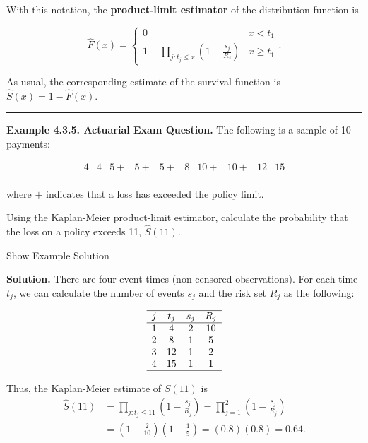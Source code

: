 \documentclass[]{book}
\theoremstyle{definition}
\theoremstyle{definition}
\theoremstyle{definition}
\theoremstyle{remark}
\begin{document}
With this notation, the \textbf{product-limit estimator} of the
distribution function is

\begin{equation}
\hat{F}(x) =
\left\{
\begin{array}{ll}
0 & x<t_{1} \\
1-\prod_{j:t_{j} \leq x}\left( 1-\frac{s_j}{R_{j}}\right) & x \geq t_{1} 
\end{array}
\right. .\label{eq:KaplanMeier}
\end{equation}

As usual, the corresponding estimate of the survival function is
\(\hat{S}(x) = 1 - \hat{F}(x)\).

\begin{center}\rule{0.5\linewidth}{\linethickness}\end{center}

\textbf{Example 4.3.5. Actuarial Exam Question.} The following is a
sample of 10 payments:

\[\begin{array}{cccccccccc}
4 &4 &5+ &5+ &5+ &8 &10+ &10+ &12 &15 \\
\end{array}\]

where \(+\) indicates that a loss has exceeded the policy limit.

Using the Kaplan-Meier product-limit estimator, calculate the
probability that the loss on a policy exceeds 11, \(\hat{S}(11)\).

Show Example Solution

\hypertarget{toggleExampleSelect.3.5}{}
\textbf{Solution.} There are four event times (non-censored
observations). For each time \(t_j\), we can calculate the number of
events \(s_j\) and the risk set \(R_j\) as the following:

\[\begin{array}{cccc}
\hline
j & t_j & s_j & R_j \\
\hline
1 & 4 & 2 & 10 \\
2 & 8 & 1 & 5 \\
3 & 12 & 1 & 2 \\
4 & 15 & 1 & 1 \\
\hline
\end{array}\]

Thus, the Kaplan-Meier estimate of \(S(11)\) is \[\begin{aligned}
\hat{S}(11) &= \prod_{j:t_j\leq 11} \left( 1- \frac{s_j}{R_j} \right) =  \prod_{j=1}^{2} \left( 1- \frac{s_j}{R_j} \right)\\
&= \left(1-\frac{2}{10} \right) \left(1-\frac{1}{5} \right) = (0.8)(0.8)= 0.64. \\
\end{aligned}\]
\end{document}
